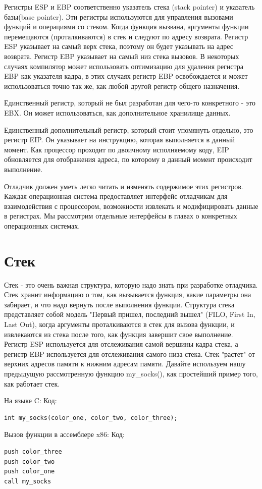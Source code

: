 \documentclass[12pt]{book}
\begin{document}
Регистры ESP и EBP соответственно указатель стека (stack pointer) и указатель базы(base pointer). Эти регистры используются для управления вызовами функций и операциями со стеком. Когда функция вызвана, аргументы функции перемещаются (проталкиваются) в стек и следуют по адресу возврата. Регистр ESP указывает на самый верх стека, поэтому он будет указывать на адрес возврата. Регистр EBP указывает на самый низ стека вызовов. В некоторых случаях компилятор может использовать оптимизацию для удаления регистра EBP как указателя кадра, в этих случаях регистр EBP освобождается и может использоваться точно так же, как любой другой регистр общего назначения.

Единственный регистр, который не был разработан для чего-то конкретного - это EBX. Он может использоваться, как дополнительное хранилище данных.

Единственный дополнительный регистр, который стоит упомянуть отдельно, это регистр EIP. Он указывает на инструкцию, которая выполняется в данный момент. Как процессор проходит по двоичному исполняемому коду, EIP обновляется для отображения адреса, по которому в данный момент происходит выполнение.

Отладчик должен уметь легко читать и изменять содержимое этих регистров. Каждая операционная система предоставляет интерфейс отладчикам для взаимодействия с процессором, возможности извлекать и модифицировать данные в регистрах. Мы рассмотрим отдельные интерфейсы в главах о конкретных операционных системах.

\section{Стек}

Стек - это очень важная структура, которую надо знать при разработке отладчика. Стек хранит информацию о том, как вызывается функция, какие параметры она забирает, и что надо вернуть после выполнения функции. Структура стека представляет собой модель "Первый пришел, последний вышел" (FILO, First In, Last Out), когда аргументы проталкиваются в стек для вызова функции, и извлекаются из стека после того, как функция завершит свое выполнение. Регистр ESP используется для отслеживания самой вершины кадра стека, а регистр EBP используется для отслеживания самого низа стека. Стек "растет" от верхних адресов памяти к нижним адресам памяти. Давайте используем нашу предыдущую рассмотренную функцию my\_socks(), как простейший пример того, как работает стек.

На языке C:
Код:
\begin{lstlisting}
int my_socks(color_one, color_two, color_three);
\end{lstlisting}
Вызов функции в ассемблере x86:
Код:
\begin{lstlisting}
push color_three
push color_two
push color_one
call my_socks
\end{lstlisting}
\end{document}
